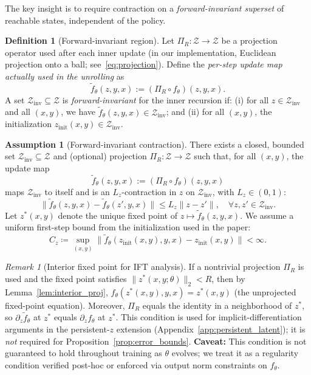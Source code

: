 \documentclass{article}
\theoremstyle{plain}
\theoremstyle{definition}
\newtheorem{definition}[theorem]{Definition}
\newtheorem{assumption}[theorem]{Assumption}
\theoremstyle{remark}
\newtheorem{remark}[theorem]{Remark}
\newcommand{\ZZ}{\mathcal{Z}}
\begin{document}
{The key insight is to require contraction on a \emph{forward-invariant superset} of reachable states, independent of the policy.

\begin{definition}[Forward-invariant region]
\label{def:forward_invariant}
Let $\Pi_R:\ZZ\to\ZZ$ be a projection operator used after each inner update
(in our implementation, Euclidean projection onto a ball; see~\eqref{eq:projection}).
Define the \emph{per-step update map actually used in the unrolling} as
\[
\tilde f_\theta(z,y,x) := (\Pi_R \circ f_\theta)(z,y,x).
\]
A set $\mathcal{Z}_{\mathrm{inv}} \subseteq \ZZ$ is \emph{forward-invariant} for the inner recursion if:
(i) for all $z \in \mathcal{Z}_{\mathrm{inv}}$ and all $(x,y)$, we have $\tilde f_\theta(z,y,x) \in \mathcal{Z}_{\mathrm{inv}}$; and
(ii) for all $(x,y)$, the initialization $z_{\mathrm{init}}(x,y) \in \mathcal{Z}_{\mathrm{inv}}$.
\end{definition}


\begin{assumption}[Forward-invariant contraction]
\label{ass:Lip}
There exists a closed, bounded set $\mathcal{Z}_{\mathrm{inv}}\subseteq\ZZ$ and (optional) projection $\Pi_R:\ZZ\to\ZZ$ such that, for all $(x,y)$, the update map
\[
\tilde f_\theta(z,y,x):=(\Pi_R\circ f_\theta)(z,y,x)
\]
maps $\mathcal{Z}_{\mathrm{inv}}$ to itself and is an $L_z$-contraction in $z$ on $\mathcal{Z}_{\mathrm{inv}}$, with $L_z\in(0,1)$:
\[
\|\tilde f_\theta(z,y,x)-\tilde f_\theta(z',y,x)\|\le L_z\|z-z'\|,\quad \forall z,z'\in\mathcal{Z}_{\mathrm{inv}}.
\]
Let $z^*(x,y)$ denote the unique fixed point of $z\mapsto \tilde f_\theta(z,y,x)$.
We assume a uniform first-step bound from the initialization used in the paper:
\begin{equation}
C_z \coloneqq \sup_{(x,y)}\bigl\|\tilde f_\theta(z_{\mathrm{init}}(x,y),y,x)-z_{\mathrm{init}}(x,y)\bigr\|<\infty.
\label{eq:Cz_def}
\end{equation}
\end{assumption}

\begin{remark}[Interior fixed point for IFT analysis]
\label{rem:interior_fp}
If a nontrivial projection $\Pi_R$ is used and the fixed point satisfies $\|z^*(x,y;\theta)\|_2 < R$, then by Lemma~\ref{lem:interior_proj}, $f_\theta(z^*(x,y),y,x)=z^*(x,y)$ (the unprojected fixed-point equation).
Moreover, $\Pi_R$ equals the identity in a neighborhood of $z^*$, so $\partial_z\tilde f_\theta$ at $z^*$ equals $\partial_z f_\theta$ at $z^*$.
This condition is used for implicit-differentiation arguments in the persistent-$z$ extension (Appendix~\ref{app:persistent_latent}); it is \emph{not} required for Proposition~\ref{prop:error_bounds}.
\textbf{Caveat:} This condition is not guaranteed to hold throughout training as $\theta$ evolves; we treat it as a regularity condition verified post-hoc or enforced via output norm constraints on $f_\theta$.
\end{remark}

}
\end{document}
